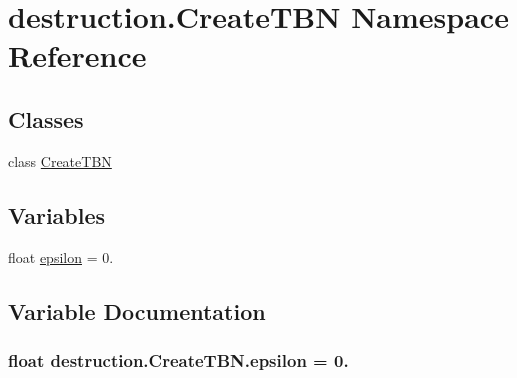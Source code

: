 \hypertarget{namespacedestruction_1_1_create_t_b_n}{\section{destruction.\-Create\-T\-B\-N Namespace Reference}
\label{namespacedestruction_1_1_create_t_b_n}
}
\subsection*{Classes}
\begin{DoxyCompactItemize}
\item 
class \hyperlink{classdestruction_1_1_create_t_b_n_1_1_create_t_b_n}{Create\-T\-B\-N}
\end{DoxyCompactItemize}
\subsection*{Variables}
\begin{DoxyCompactItemize}
\item 
float \hyperlink{namespacedestruction_1_1_create_t_b_n_acfe2ff8082f45788ed2f0c290dc4cb8e}{epsilon} = 0.
\end{DoxyCompactItemize}


\subsection{Variable Documentation}
\hypertarget{namespacedestruction_1_1_create_t_b_n_acfe2ff8082f45788ed2f0c290dc4cb8e}{
\subsubsection[{epsilon}]{\setlength{\rightskip}{0pt plus 5cm}float destruction.\-Create\-T\-B\-N.\-epsilon = 0.}}\label{namespacedestruction_1_1_create_t_b_n_acfe2ff8082f45788ed2f0c290dc4cb8e}
